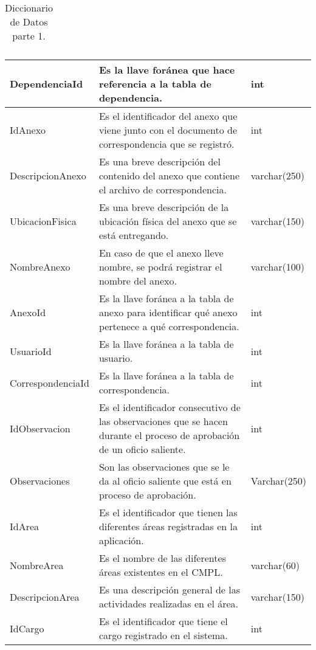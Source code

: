 \begin{table}[htbp!]
\begin{center}
\begin{tabular}{| l | l | l |}
\end{tabular}
		\caption{Diccionario de Datos parte 1.}
		\label{Diccionario}
	\end{center}
\end{table}

\begin{table}[htbp!]
	\begin{center}
		\begin{tabular}{|l | l | l}\hline
			DependenciaId & Es la llave foránea que hace referencia a la tabla de dependencia. & int\\\hline
			IdAnexo & Es el identificador del anexo que viene junto con el documento de correspondencia que se registró. & int\\\hline
			DescripcionAnexo & Es una breve descripción del contenido del anexo que contiene el archivo de correspondencia. & varchar(250)\\\hline
			UbicacionFisica & Es una breve descripción de la ubicación física del anexo que se está entregando. & varchar(150)\\\hline
			NombreAnexo & En caso de que el anexo lleve nombre, se podrá registrar el nombre del anexo. & varchar(100)\\\hline
			AnexoId & Es la llave foránea a la tabla de anexo para identificar qué anexo pertenece a qué correspondencia. & int\\\hline
			UsuarioId & Es la llave foránea a la tabla de usuario. & int\\\hline
			CorrespondenciaId & Es la llave foránea a la tabla de correspondencia. & int\\\hline
			IdObservacion & Es el identificador consecutivo de las observaciones que se hacen durante el proceso de aprobación de un oficio saliente. & int\\\hline 
			Observaciones & Son las observaciones que se le da al oficio saliente que está en proceso de aprobación. & Varchar(250)\\\hline
			IdArea & Es el identificador que tienen las diferentes áreas registradas en la aplicación. & int\\\hline
			NombreArea & Es el nombre de las diferentes áreas existentes en el CMPL. & varchar(60)\\\hline
			DescripcionArea & Es una descripción general de las actividades realizadas en el área. & varchar(150)\\\hline
			IdCargo & Es el identificador que tiene el cargo registrado en el sistema. & int \\\hline

\end{tabular}
\end{center}
\end{table}
